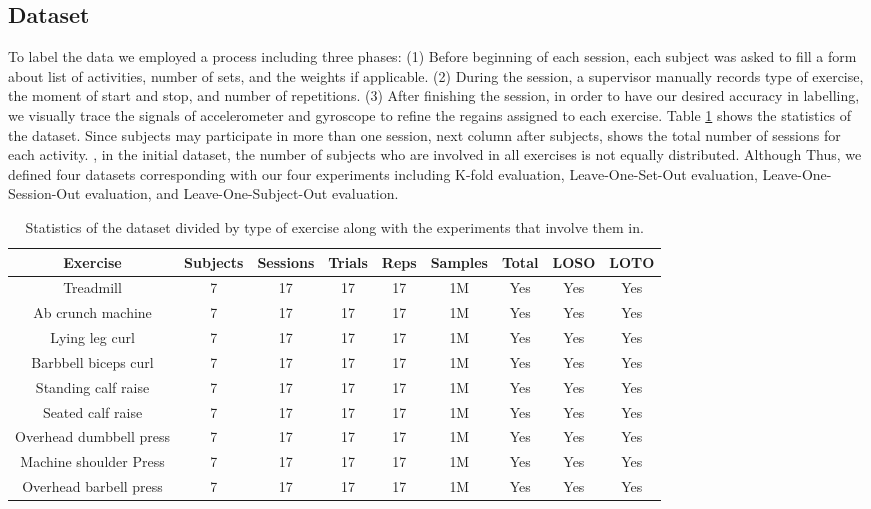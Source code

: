 \documentclass[journal,article,submit,moreauthors,pdftex]{Definitions/mdpi}
\begin{document}
\subsection{Dataset}
To label the data we employed a process including three phases: (1) Before beginning of each session, each subject was asked to fill a form about list of activities, number of sets, and the weights if applicable. (2) During the session, a supervisor manually records type of exercise, the moment of start and stop, and number of repetitions. (3) After finishing the session, in order to have our desired accuracy in labelling, we visually trace the signals of accelerometer and gyroscope to refine the regains assigned to each exercise.
Table \ref{dataset_statistics} shows the statistics of the dataset. Since subjects may participate in more than one session, next column after subjects, shows the total number of sessions for each activity.  , in the initial dataset, the number of subjects who are involved in all exercises is not equally distributed. Although  Thus, we defined four datasets corresponding with our four experiments including K-fold evaluation, Leave-One-Set-Out evaluation, Leave-One-Session-Out evaluation, and Leave-One-Subject-Out evaluation.
\begin{table}[H]
	\caption{Statistics of the dataset divided by type of exercise along with the experiments that involve them in.}
	\centering
	\begin{tabular}{ccccccccc}
		\toprule
		\textbf{Exercise} & \textbf{Subjects} & \textbf{Sessions}	& \textbf{Trials} & \textbf{Reps} & \textbf{Samples} & \textbf{Total} & \textbf{LOSO} & \textbf{LOTO} \\
		\midrule
		Treadmill& 7& 17& 17& 17& 1M& Yes& Yes& Yes\\
		Ab crunch machine& 7& 17& 17& 17& 1M& Yes& Yes& Yes\\
		Lying leg curl& 7& 17& 17& 17& 1M& Yes& Yes& Yes\\
		Barbbell biceps curl& 7& 17& 17& 17& 1M& Yes& Yes& Yes\\
		Standing calf raise& 7& 17& 17& 17& 1M& Yes& Yes& Yes\\
		Seated calf raise& 7& 17& 17& 17& 1M& Yes& Yes& Yes\\
		Overhead dumbbell press& 7& 17& 17& 17& 1M& Yes& Yes& Yes\\
		Machine shoulder Press& 7& 17& 17& 17& 1M& Yes& Yes& Yes\\
		Overhead barbell press& 7& 17& 17& 17& 1M& Yes& Yes& Yes\\
		\bottomrule
	\end{tabular}
	\label{dataset_statistics}
\end{table}
\end{document}

